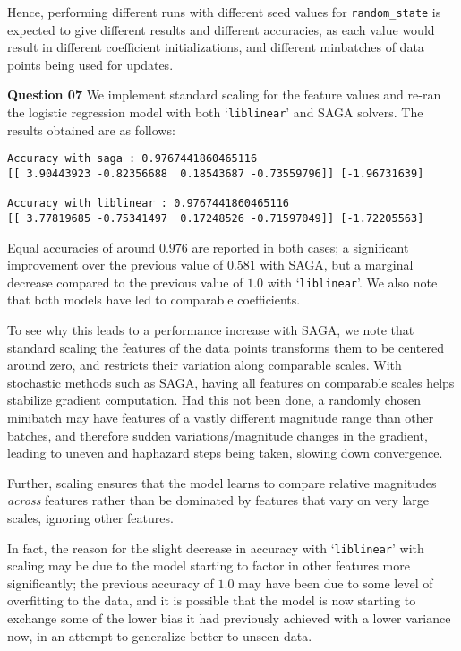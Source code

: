 \documentclass{article}[a4paper]
\begin{document}
	Hence, performing different runs with different seed values for \texttt{random\_state} is expected to give different results and different accuracies, as each value would result in different coefficient initializations, and different minbatches of data points being used for updates.
	\medskip

	\textbf{Question 07} We implement standard scaling for the feature values and re-ran the logistic regression model with both `\texttt{liblinear}' and SAGA solvers. The results obtained are as follows:
	\begin{verbatim}
Accuracy with saga : 0.9767441860465116
[[ 3.90443923 -0.82356688  0.18543687 -0.73559796]] [-1.96731639]

Accuracy with liblinear : 0.9767441860465116
[[ 3.77819685 -0.75341497  0.17248526 -0.71597049]] [-1.72205563]
\end{verbatim}
	Equal accuracies of around $0.976$ are reported in both cases; a significant improvement over the previous value of $0.581$ with SAGA, but a marginal decrease compared to the previous value of $1.0$ with `\texttt{liblinear}'. We also note that both models have led to comparable coefficients.

	To see why this leads to a performance increase with SAGA, we note that standard scaling the features of the data points transforms them to be centered around zero, and restricts their variation along comparable scales. With stochastic methods such as SAGA, having all features on comparable scales helps stabilize gradient computation. Had this not been done, a randomly chosen minibatch may have features of a vastly different magnitude range than other batches, and therefore sudden variations/magnitude changes in the gradient, leading to uneven and haphazard steps being taken, slowing down convergence.

	Further, scaling ensures that the model learns to compare relative magnitudes \textit{across} features rather than be dominated by features that vary on very large scales, ignoring other features.

	In fact, the reason for the slight decrease in accuracy with `\texttt{liblinear}' with scaling may be due to the model starting to factor in other features more significantly; the previous accuracy of $1.0$ may have been due to some level of overfitting to the data, and it is possible that the model is now starting to exchange some of the lower bias it had previously achieved with a lower variance now, in an attempt to generalize better to unseen data.
	\medskip
\end{document}
